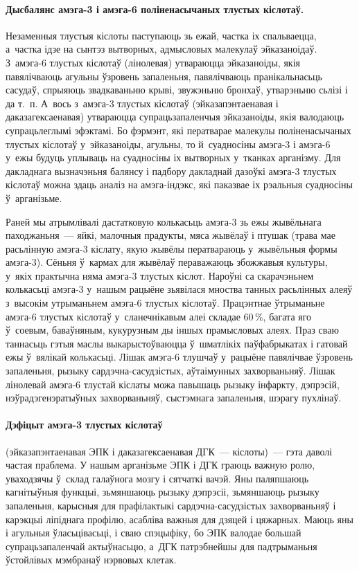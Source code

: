 \paragraph{Дысбалянс амэга-3 і амэга-6 поліненасычаных тлустых кіслотаў.}
Незаменныя тлустыя кіслоты паступаюць зь ежай, частка іх спальваецца, а~частка ідзе на сынтэз вытворных, адмысловых малекулаў эйказаноідаў. З~амэга-6 тлустых кіслотаў (лінолевая) утвараюцца эйказаноіды, якія павялічваюць агульны ўзровень запаленьня, павялічваюць пранікальнасьць сасудаў, спрыяюць звадкаваньню крыві, звужэньню бронхаў, утварэньню сьлізі і да т.~п. А~вось з~амэга-3 тлустых кіслотаў (эйказапэнтаенавая і даказагексаенавая) утвараюцца супрацьзапаленчыя эйказаноіды, якія валодаюць супрацьлеглымі эфэктамі. Бо фэрмэнт, які ператварае малекулы поліненасычаных тлустых кіслотаў у~эйказаноіды, агульны, то й~суадносіны амэга-3 і амэга-6 у~ежы будуць уплываць на суадносіны іх вытворных у~тканках арганізму. Для дакладнага вызначэньня балянсу і падбору дакладнай дазоўкі амэга-3 тлустых кіслотаў можна здаць аналіз на амэга-індэкс, які паказвае іх рэальныя суадносіны ў~арганізьме.


Раней мы атрымлівалі дастатковую колькасьць амэга-3 зь ежы жывёльнага паходжаньня~--- яйкі, малочныя прадукты, мяса жывёлаў і птушак (трава мае расьлінную амэга-3 кіслату, якую жывёлы ператвараюць у~жывёльныя формы амэга-3). Сёньня ў~кармах для жывёлаў пераважаюць збожжавыя культуры, у~якіх практычна няма амэга-3 тлустых кіслот. Нароўні са скарачэньнем колькасьці амэга-3 у~нашым рацыёне зьявілася мноства танных расьлінных алеяў з~высокім утрыманьнем амэга-6 тлустых кіслотаў. Працэнтнае ўтрыманьне амэга-6 тлустых кіслотаў у~сланечнікавым алеі складае 60\,\%, багата яго ў~соевым, баваўняным, кукурузным ды іншых прамысловых алеях. Праз сваю таннасьць гэтыя маслы выкарыстоўваюцца ў~шматлікіх паўфабрыкатах і гатовай ежы ў~вялікай колькасьці. Лішак амэга-6 тлушчаў у~рацыёне павялічвае ўзровень запаленьня, рызыку сардэчна-сасудзістых, аўтаімунных захворваньняў. Лішак лінолевай амэга-6 тлустай кіслаты можа павышаць рызыку інфаркту, дэпрэсій, нэўрадэгенэратыўных захворваньняў, сыстэмнага запаленьня, шэрагу пухлінаў.

\paragraph{Дэфіцыт амэга-3 тлустых кіслотаў} (эйказапэнтаенавая ЭПК і даказагексаенавая ДГК~--- кіслоты)~--- гэта даволі частая праблема.
У нашым арганізьме ЭПК і ДГК граюць важную ролю, уваходзячы ў~склад галаўнога мозгу і сятчаткі вачэй. Яны паляпшаюць кагнітыўныя функцыі, зьмяншаюць рызыку дэпрэсіі, зьмяншаюць рызыку запаленьня, карысныя для прафілактыкі сардэчна-сасудзістых захворваньняў і карэкцыі ліпіднага профілю, асабліва важныя для дзяцей і цяжарных. Маюць яны і агульныя ўласьцівасьці, і сваю спэцыфіку, бо ЭПК валодае большай супрацьзапаленчай актыўнасьцю, а~ДГК патрэбнейшы для падтрыманьня ўстойлівых мэмбранаў нэрвовых клетак.

